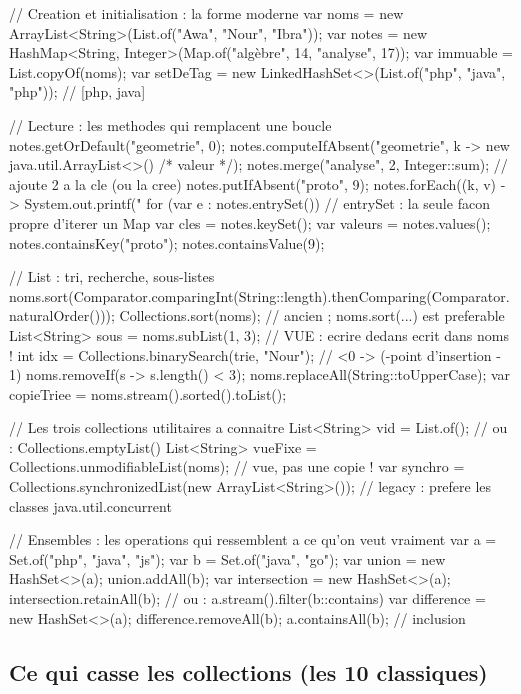 \documentclass[12pt,a4paper,twoside,openright]{book}
\begin{document}
\begin{codejava}
// Creation et initialisation : la forme moderne
var noms = new ArrayList<String>(List.of("Awa", "Nour", "Ibra"));
var notes = new HashMap<String, Integer>(Map.of("alg\`ebre", 14, "analyse", 17));
var immuable = List.copyOf(noms);
var setDeTag = new LinkedHashSet<>(List.of("php", "java", "php"));   // [php, java]

// Lecture : les methodes qui remplacent une boucle
notes.getOrDefault("geometrie", 0);
notes.computeIfAbsent("geometrie", k -> new java.util.ArrayList<>() /* valeur */);
notes.merge("analyse", 2, Integer::sum);                 // ajoute 2 a la cle (ou la cree)
notes.putIfAbsent("proto", 9);
notes.forEach((k, v) -> System.out.printf("%
for (var e : notes.entrySet()) { }                        // entrySet : la seule facon propre d'iterer un Map
var cles = notes.keySet(); var valeurs = notes.values();
notes.containsKey("proto"); notes.containsValue(9);

// List : tri, recherche, sous-listes
noms.sort(Comparator.comparingInt(String::length).thenComparing(Comparator.naturalOrder()));
Collections.sort(noms);                                    // ancien ; noms.sort(...) est preferable
List<String> sous = noms.subList(1, 3);                     // VUE : ecrire dedans ecrit dans noms !
int idx = Collections.binarySearch(trie, "Nour");            // <0 -> (-point d'insertion - 1)
noms.removeIf(s -> s.length() < 3);
noms.replaceAll(String::toUpperCase);
var copieTriee = noms.stream().sorted().toList();

// Les trois collections utilitaires a connaitre
List<String> vid = List.of();                              // ou : Collections.emptyList()
List<String> vueFixe = Collections.unmodifiableList(noms); // vue, pas une copie !
var synchro = Collections.synchronizedList(new ArrayList<String>());  // legacy : prefere les classes java.util.concurrent

// Ensembles : les operations qui ressemblent a ce qu'on veut vraiment
var a = Set.of("php", "java", "js");
var b = Set.of("java", "go");
var union = new HashSet<>(a); union.addAll(b);
var intersection = new HashSet<>(a); intersection.retainAll(b);   // ou : a.stream().filter(b::contains)
var difference = new HashSet<>(a); difference.removeAll(b);
a.containsAll(b);                                            // inclusion
\end{codejava}

\subsection{Ce qui casse les collections (les 10 classiques)}
\end{document}

